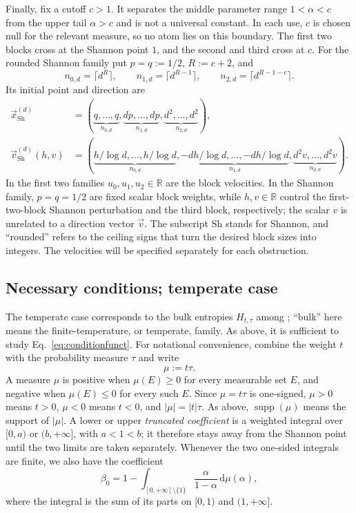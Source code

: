 \documentclass[aps,pra,11pt,onecolumn,nofootinbib,tightenlines]{revtex4-2}
\theoremstyle{definition}
\def \d {\mathrm{d}}
\newcommand{\R}{\mathbb{R}}
\begin{document}
Finally, fix a cutoff $c>1$.  It separates the middle parameter range
$1<\alpha<c$ from the upper tail $\alpha>c$ and is not a universal constant.
In each use, $c$ is chosen null for the relevant measure, so no atom
lies on this boundary.  The first two blocks cross at the Shannon point $1$,
and the second and third cross at $c$.  For the rounded Shannon family put
$p=q:=1/2$, $R:=c+2$, and
\begin{equation}
n_{0,d}=\lceil d^R\rceil,
\qquad
n_{1,d}=\lceil d^{R-1}\rceil,
\qquad
n_{2,d}=\lceil d^{R-1-c}\rceil.
\end{equation}
Its initial point and direction are
\begin{align}
\vec{x}_{\mathrm{Sh}}^{(d)}
&=\left(
\underbrace{q,\ldots,q}_{n_{0,d}},
\underbrace{dp,\ldots,dp}_{n_{1,d}},
\underbrace{d^2,\ldots,d^2}_{n_{2,d}}
\right),
\label{eq:concise-Shannon-point}\\
\vec{v}_{\mathrm{Sh}}^{(d)}(h,v)
&=\left(
\underbrace{h/\log d,\ldots,h/\log d}_{n_{0,d}},
\underbrace{-dh/\log d,\ldots,-dh/\log d}_{n_{1,d}},
\underbrace{d^2v,\ldots,d^2v}_{n_{2,d}}
\right).
\label{eq:concise-Shannon-direction}
\end{align}
In the first two families $u_0,u_1,u_2\in\R$ are the block velocities.  In
the Shannon family, $p=q=1/2$ are fixed scalar block weights, while
$h,v\in\R$ control the first-two-block Shannon perturbation and the third
block, respectively; the scalar $v$ is unrelated to a direction vector
$\vec{v}$.  The subscript $\mathrm{Sh}$ stands for Shannon, and ``rounded''
refers to the ceiling signs that turn the desired block sizes into integers.
The velocities will be specified separately for each obstruction.

\subsection{Necessary conditions; temperate case}

The temperate case corresponds to the bulk entropies $H_{t,\tau}$ among
\ParameterMainForms; ``bulk'' here means the finite-temperature, or temperate,
family.  As above, it is sufficient to study
Eq.~\eqref{eq:conditionfunct}.  For notational convenience, combine the weight
$t$ with the probability measure $\tau$ and write
\begin{equation}
\mu:=t\tau.
\end{equation}
A measure $\mu$ is positive when $\mu(E)\geq0$ for every measurable set $E$,
and negative when $\mu(E)\leq0$ for every such $E$.  Since $\mu=t\tau$ is
one-signed, $\mu>0$ means $t>0$, $\mu<0$ means $t<0$, and
$|\mu|=|t|\tau$.  As above, $\operatorname{supp}(\mu)$ means the support of
$|\mu|$.  A lower or upper \emph{truncated coefficient} is a weighted integral
over $[0,a)$ or $(b,+\infty]$, with $a<1<b$; it therefore stays away from the
Shannon point until the two limits are taken separately.
Whenever the two one-sided integrals are finite, we also have the coefficient
\begin{equation}
\label{eq:definition-beta0}
\beta_0=1-
\int_{[0,+\infty]\setminus\{1\}}
\frac{\alpha}{1-\alpha}\,\d\mu(\alpha),
\end{equation}
where the integral is the sum of its parts on $[0,1)$ and $(1,+\infty]$.
\end{document}
